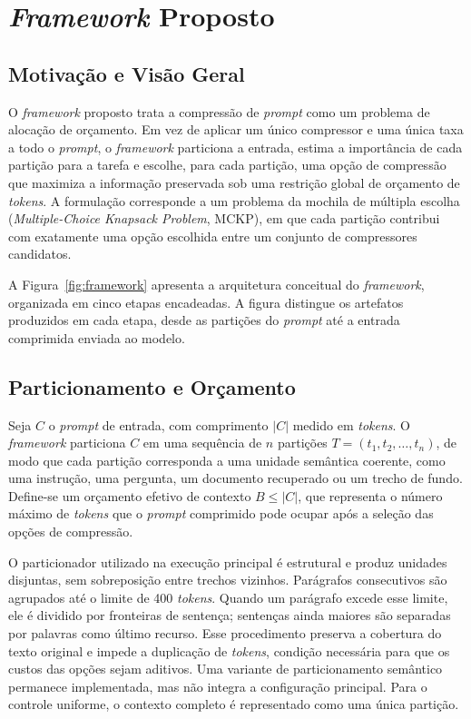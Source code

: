 \section{\textit{Framework} Proposto}
\label{sec:framework}

\subsection{Motivação e Visão Geral}
\label{subsec:motivacao-framework}

O \textit{framework} proposto trata a compressão de \textit{prompt} como um problema de alocação de orçamento. Em vez de aplicar um único compressor e uma única taxa a todo o \textit{prompt}, o \textit{framework} particiona a entrada, estima a importância de cada partição para a tarefa e escolhe, para cada partição, uma opção de compressão que maximiza a informação preservada sob uma restrição global de orçamento de \textit{tokens}. A formulação corresponde a um problema da mochila de múltipla escolha (\textit{Multiple-Choice Knapsack Problem}, MCKP), em que cada partição contribui com exatamente uma opção escolhida entre um conjunto de compressores candidatos.

A Figura~\ref{fig:framework} apresenta a arquitetura conceitual do \textit{framework}, organizada em cinco etapas encadeadas. A figura distingue os artefatos produzidos em cada etapa, desde as partições do \textit{prompt} até a entrada comprimida enviada ao modelo.



\subsection{Particionamento e Orçamento}
\label{subsec:particionamento}

Seja $C$ o \textit{prompt} de entrada, com comprimento $|C|$ medido em \textit{tokens}. O \textit{framework} particiona $C$ em uma sequência de $n$ partições $T = (t_1, t_2, \ldots, t_n)$, de modo que cada partição corresponda a uma unidade semântica coerente, como uma instrução, uma pergunta, um documento recuperado ou um trecho de fundo. Define-se um orçamento efetivo de contexto $B \leq |C|$, que representa o número máximo de \textit{tokens} que o \textit{prompt} comprimido pode ocupar após a seleção das opções de compressão.

O particionador utilizado na execução principal é estrutural e produz unidades disjuntas, sem sobreposição entre trechos vizinhos. Parágrafos consecutivos são agrupados até o limite de 400 \textit{tokens}. Quando um parágrafo excede esse limite, ele é dividido por fronteiras de sentença; sentenças ainda maiores são separadas por palavras como último recurso. Esse procedimento preserva a cobertura do texto original e impede a duplicação de \textit{tokens}, condição necessária para que os custos das opções sejam aditivos. Uma variante de particionamento semântico permanece implementada, mas não integra a configuração principal. Para o controle uniforme, o contexto completo é representado como uma única partição.

